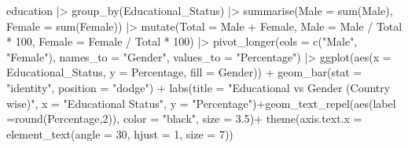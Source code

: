\documentclass[
  11pt,
  a4paper,
  DIV=11,
  numbers=noendperiod]{scrartcl}
\newenvironment{Shaded}{\begin{snugshade}}{\end{snugshade}}
\newcommand{\AttributeTok}[1]{\textcolor[rgb]{0.40,0.45,0.13}{#1}}
\newcommand{\DecValTok}[1]{\textcolor[rgb]{0.68,0.00,0.00}{#1}}
\newcommand{\FloatTok}[1]{\textcolor[rgb]{0.68,0.00,0.00}{#1}}
\newcommand{\FunctionTok}[1]{\textcolor[rgb]{0.28,0.35,0.67}{#1}}
\newcommand{\NormalTok}[1]{\textcolor[rgb]{0.00,0.23,0.31}{#1}}
\newcommand{\SpecialCharTok}[1]{\textcolor[rgb]{0.37,0.37,0.37}{#1}}
\newcommand{\StringTok}[1]{\textcolor[rgb]{0.13,0.47,0.30}{#1}}
\begin{document}
\begin{Shaded}
\begin{Highlighting}[]
\NormalTok{ education }\SpecialCharTok{|\textgreater{}} \FunctionTok{group\_by}\NormalTok{(Educational\_Status)  }\SpecialCharTok{|\textgreater{}}
  \FunctionTok{summarise}\NormalTok{(}\AttributeTok{Male =} \FunctionTok{sum}\NormalTok{(Male),}
            \AttributeTok{Female =} \FunctionTok{sum}\NormalTok{(Female)) }\SpecialCharTok{|\textgreater{}} \FunctionTok{mutate}\NormalTok{(}\AttributeTok{Total =}\NormalTok{ Male }\SpecialCharTok{+}\NormalTok{ Female,}
         \AttributeTok{Male =}\NormalTok{ Male }\SpecialCharTok{/}\NormalTok{ Total }\SpecialCharTok{*} \DecValTok{100}\NormalTok{,}
         \AttributeTok{Female =}\NormalTok{ Female }\SpecialCharTok{/}\NormalTok{ Total }\SpecialCharTok{*} \DecValTok{100}\NormalTok{) }\SpecialCharTok{|\textgreater{}}
  \FunctionTok{pivot\_longer}\NormalTok{(}\AttributeTok{cols =} \FunctionTok{c}\NormalTok{(}\StringTok{"Male"}\NormalTok{, }\StringTok{"Female"}\NormalTok{), }\AttributeTok{names\_to =} \StringTok{"Gender"}\NormalTok{, }\AttributeTok{values\_to =} \StringTok{"Percentage"}\NormalTok{) }\SpecialCharTok{|\textgreater{}}
  \FunctionTok{ggplot}\NormalTok{(}\FunctionTok{aes}\NormalTok{(}\AttributeTok{x =}\NormalTok{ Educational\_Status, }\AttributeTok{y =}\NormalTok{ Percentage, }\AttributeTok{fill =}\NormalTok{ Gender)) }\SpecialCharTok{+}
  \FunctionTok{geom\_bar}\NormalTok{(}\AttributeTok{stat =} \StringTok{"identity"}\NormalTok{, }\AttributeTok{position =} \StringTok{"dodge"}\NormalTok{) }\SpecialCharTok{+}
  \FunctionTok{labs}\NormalTok{(}\AttributeTok{title =} \StringTok{"Educational vs Gender (Country wise)"}\NormalTok{, }\AttributeTok{x =} \StringTok{"Educational Status"}\NormalTok{, }\AttributeTok{y =} \StringTok{"Percentage"}\NormalTok{)}\SpecialCharTok{+}\FunctionTok{geom\_text\_repel}\NormalTok{(}\FunctionTok{aes}\NormalTok{(}\AttributeTok{label =}\FunctionTok{round}\NormalTok{(Percentage,}\DecValTok{2}\NormalTok{)), }\AttributeTok{color =} \StringTok{"black"}\NormalTok{, }\AttributeTok{size =} \FloatTok{3.5}\NormalTok{)}\SpecialCharTok{+}
  \FunctionTok{theme}\NormalTok{(}\AttributeTok{axis.text.x =} \FunctionTok{element\_text}\NormalTok{(}\AttributeTok{angle =} \DecValTok{30}\NormalTok{, }\AttributeTok{hjust =} \DecValTok{1}\NormalTok{, }\AttributeTok{size =} \DecValTok{7}\NormalTok{))}
\end{Highlighting}
\end{Shaded}
\end{document}

